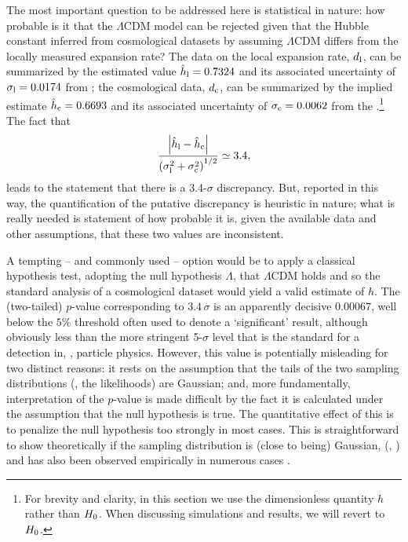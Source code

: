 \documentclass[a4paper,fleqn,usenatbib]{mnras}
\newcommand{\riess}{\citetalias{Riess_etal:2016}}
\newcommand{\msame}{\Lambda}
\newcommand{\hlobs}{\hat{h}_{\rm l}}
\newcommand{\hcobs}{\hat{h}_{\rm c}}
\newcommand{\hlerr}{\sigma_{\rm l}}
\newcommand{\hcerr}{\sigma_{\rm c}}
\newcommand{\datl}{d_{\rm l}}
\newcommand{\datc}{d_{\rm c}}
\begin{document}
{The most important question to be addressed here is statistical in nature:
how probable is it that
the $\Lambda$CDM model can be rejected given that 
the Hubble constant inferred from cosmological datasets by 
assuming $\Lambda$CDM
differs from the locally measured expansion rate?
The data on the local expansion rate, $\datl$, can be summarized by 
the estimated value
$\hlobs = 0.7324$ and its associated uncertainty of $\hlerr = 0.0174$
from \riess;
the cosmological data, $\datc$, can be summarized by the implied 
estimate 
$\hcobs = 0.6693$ and its associated uncertainty of $\hcerr = 0.0062$
from the \cite{Planck_Int_XLVI:2016}.\footnote{For brevity and clarity, 
in this section we use the dimensionless quantity $h$ rather than 
$H_0$. When discussing simulations and results, we will revert 
to $H_0$.} The fact that 
\begin{equation}
\frac{
\left|\hlobs - \hcobs\right| 
}
{
\left( \hlerr^2 + \hcerr^2 \right)^{1/2}
}
\simeq
3.4
,
\end{equation}
leads to the statement that 
there is a 3.4-$\sigma$ discrepancy.
But, reported in this way, the
quantification of the putative discrepancy is heuristic in nature;
what is really needed is statement of how probable it is,
given the available data and other assumptions, 
that these two values are inconsistent.

A tempting -- and commonly used -- option would be to 
apply a classical hypothesis test, 
adopting the null hypothesis $\msame$, that 
$\Lambda$CDM holds and so the standard analysis 
of a cosmological dataset would yield a valid estimate of $h$.
The (two-tailed) $p$-value corresponding to $3.4 \, \sigma$
is an apparently decisive $0.00067$, 
well below the $5\%$ threshold often 
used to denote a `significant' result,
although obviously less than the more stringent
5-$\sigma$ level that is the standard for a 
detection in, \eg, particle physics.
However, this value is potentially misleading for two
distinct reasons:
it rests on the assumption that the tails of the two sampling 
distributions (\ie, the likelihoods) are Gaussian;
and, more fundamentally, interpretation of the
$p$-value
is made difficult by the fact it is calculated under
the assumption that the null hypothesis is true.
The quantitative effect of this is to penalize the 
null hypothesis too strongly in most cases.
This is straightforward to show theoretically if the 
sampling distribution is (close to being) Gaussian, 
(\eg, \citealt{Berger_Delampady:1987}) 
and has also been observed empirically 
in numerous cases \citep{Johnson:2013}.

}
\end{document}
